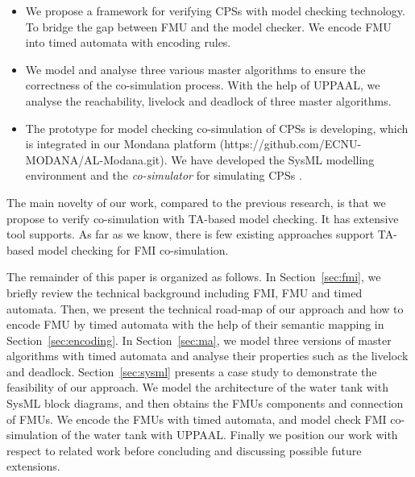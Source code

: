 \begin{itemize}
\item
We propose a framework for verifying CPSs with model checking technology. To bridge the gap between FMU and the model checker. We encode FMU into timed automata with encoding rules.
\item
We model and analyse three various master algorithms to ensure the correctness of the co-simulation process. With the help of UPPAAL, we analyse the reachability, livelock and deadlock of three master algorithms.
\item
The prototype for model checking co-simulation of CPSs is developing, which is integrated in our Mondana platform \cite{Cheng2015Modana}(https://github.com/ECNU-MODANA/AL-Modana.git). We have developed the SysML modelling environment and the \textit{co-simulator} for simulating CPSs \cite{Fritzson1998Modelica}.
\end{itemize}
The main novelty of our work, compared to the previous research, is that we propose to verify co-simulation with TA-based model checking. It has extensive tool supports. As far as we know, there is few existing approaches support TA-based model checking for FMI co-simulation.

The remainder of this paper is organized as follows. In Section~\ref{sec:fmi}, we briefly review the technical background including FMI, FMU and timed automata. Then, we present the technical road-map of our approach and how to encode FMU by timed automata with the help of their semantic mapping in Section~\ref{sec:encoding}. In Section~\ref{sec:ma}, we model three versions of master algorithms with timed automata and analyse their properties such as the livelock and deadlock. Section~\ref{sec:sysml} presents a case study to demonstrate the feasibility of our approach. We model the architecture of the water tank with SysML block diagrams, and then obtains the FMUs components and connection of FMUs. We encode the FMUs with timed automata, and model check FMI co-simulation of the water tank with UPPAAL. Finally we position our work with respect to related work before concluding and discussing possible future extensions.




















